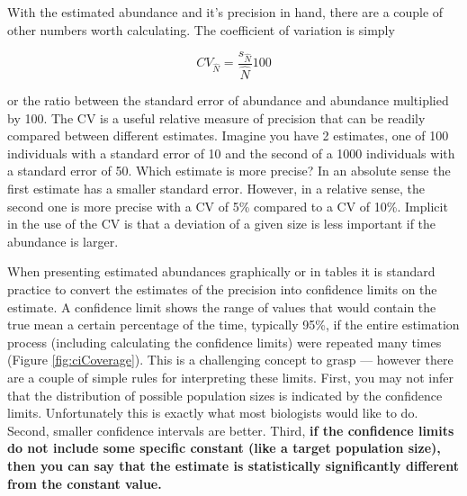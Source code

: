 \documentclass[]{book}
\theoremstyle{definition}
\theoremstyle{definition}
\theoremstyle{definition}
\theoremstyle{remark}
\begin{document}
With the estimated abundance and it's precision in hand, there are a
couple of other numbers worth calculating. The coefficient of variation
is simply

\begin{equation}
  CV_{\hat{N}} =\frac{s_{\hat{N}}}{\hat{N}}  100
  \label{eq:cv}
\end{equation}

or the ratio between the standard error of abundance and abundance
multiplied by 100. The CV is a useful relative measure of precision that
can be readily compared between different estimates. Imagine you have 2
estimates, one of 100 individuals with a standard error of 10 and the
second of a 1000 individuals with a standard error of 50. Which estimate
is more precise? In an absolute sense the first estimate has a smaller
standard error. However, in a relative sense, the second one is more
precise with a CV of 5\% compared to a CV of 10\%. Implicit in the use
of the CV is that a deviation of a given size is less important if the
abundance is larger.

When presenting estimated abundances graphically or in tables it is
standard practice to convert the estimates of the precision into
confidence limits on the estimate. A confidence limit shows the range of
values that would contain the true mean a certain percentage of the
time, typically 95\%, if the entire estimation process (including
calculating the confidence limits) were repeated many times (Figure
\ref{fig:ciCoverage}). This is a challenging concept to grasp ---
however there are a couple of simple rules for interpreting these
limits. First, you may not infer that the distribution of possible
population sizes is indicated by the confidence limits. Unfortunately
this is exactly what most biologists would like to do. Second, smaller
confidence intervals are better. Third, \textbf{if the confidence limits
do not include some specific constant (like a target population size),
then you can say that the estimate is statistically significantly
different from the constant value.}
\end{document}
